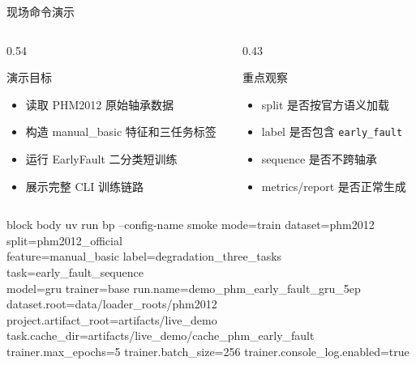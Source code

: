 \documentclass[aspectratio=169,11pt]{ctexbeamer}
\newcommand{\code}[1]{\texttt{#1}}
\begin{document}
\begin{frame}[t]{现场命令演示}
  \begin{columns}[T,onlytextwidth]
    \begin{column}{0.54\textwidth}
      \begin{block}{演示目标}
        \begin{itemize}
          \item 读取 PHM2012 原始轴承数据
          \item 构造 manual\_basic 特征和三任务标签
          \item 运行 EarlyFault 二分类短训练
          \item 展示完整 CLI 训练链路
        \end{itemize}
      \end{block}
    \end{column}
    \begin{column}{0.43\textwidth}
      \begin{block}{重点观察}
        \begin{itemize}
          \item split 是否按官方语义加载
          \item label 是否包含 \code{early\_fault}
          \item sequence 是否不跨轴承
          \item metrics/report 是否正常生成
        \end{itemize}
      \end{block}
    \end{column}
  \end{columns}

  \vspace{0.6em}
  \begin{beamercolorbox}[wd=\linewidth,rounded=true,sep=0.65em]{block body}
    {\scriptsize\ttfamily
    uv run bp --config-name smoke mode=train dataset=phm2012 split=phm2012\_official\\
    feature=manual\_basic label=degradation\_three\_tasks task=early\_fault\_sequence\\
    model=gru trainer=base run.name=demo\_phm\_early\_fault\_gru\_5ep\\
    dataset.root=data/loader\_roots/phm2012 project.artifact\_root=artifacts/live\_demo\\
    task.cache\_dir=artifacts/live\_demo/cache\_phm\_early\_fault\\
    trainer.max\_epochs=5 trainer.batch\_size=256 trainer.console\_log.enabled=true}
  \end{beamercolorbox}
\end{frame}
\end{document}

